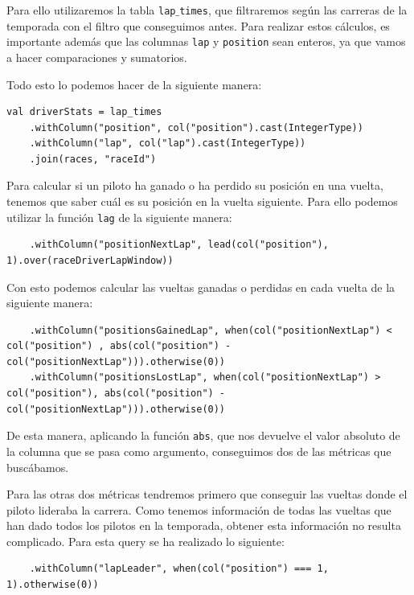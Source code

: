 \documentclass[12pt,twoside,titlepage]{report}
\begin{document}
Para ello utilizaremos la tabla \texttt{lap$\_$times}, que filtraremos según las carreras de la temporada con el filtro que conseguimos antes. Para realizar estos cálculos, es importante además que las columnas \texttt{lap} y \texttt{position} sean enteros, ya que vamos a hacer comparaciones y sumatorios.

Todo esto lo podemos hacer de la siguiente manera:

\begin{lstlisting}
val driverStats = lap_times
	.withColumn("position", col("position").cast(IntegerType)) 
	.withColumn("lap", col("lap").cast(IntegerType)) 
	.join(races, "raceId")
\end{lstlisting}

Para calcular si un piloto ha ganado o ha perdido su posición en una vuelta, tenemos que saber cuál es su posición en la vuelta siguiente. Para ello podemos utilizar la función \texttt{lag} de la siguiente manera:

\begin{lstlisting}
	.withColumn("positionNextLap", lead(col("position"), 1).over(raceDriverLapWindow))
\end{lstlisting}


Con esto podemos calcular las vueltas ganadas o perdidas en cada vuelta de la siguiente manera:

\begin{lstlisting}
	.withColumn("positionsGainedLap", when(col("positionNextLap") < col("position") , abs(col("position") - col("positionNextLap"))).otherwise(0))
	.withColumn("positionsLostLap", when(col("positionNextLap") > col("position"), abs(col("position") - col("positionNextLap"))).otherwise(0))
\end{lstlisting}

De esta manera, aplicando la función \texttt{abs}, que nos devuelve el valor absoluto de la columna que se pasa como argumento, conseguimos dos de las métricas que buscábamos.

Para las otras dos métricas tendremos primero que conseguir las vueltas donde el piloto lideraba la carrera. Como tenemos información de todas las vueltas que han dado todos los pilotos en la temporada, obtener esta información no resulta complicado. Para esta query se ha realizado lo siguiente:

\begin{lstlisting}
	.withColumn("lapLeader", when(col("position") === 1, 1).otherwise(0))
\end{lstlisting}
\end{document}
